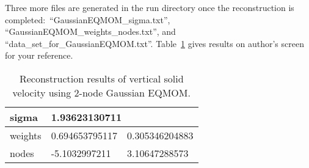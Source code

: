 \documentclass[a4paper,12pt,titlepage]{article}
\begin{document}
Three more files are generated in the run directory once the reconstruction is
completed:\ ``GaussianEQMOM\_sigma.txt'',
\\``GaussianEQMOM\_weights\_nodes.txt'', and
\\``data\_set\_for\_GaussianEQMOM.txt''. Table~\ref{tab:ReconVs} gives results
on author's screen for your reference.

\begin{table}[htp]
 \centering
 \begin{tabular}{l|ll} \hline
  sigma   & \multicolumn{2}{l}{1.93623130711} \\ \hline
  weights & 0.694653795117 & 0.305346204883   \\ \hline
  nodes   & -5.1032997211  & 3.10647288573    \\ \hline
 \end{tabular}
 \caption{Reconstruction results of vertical solid velocity using $2$-node 
 Gaussian EQMOM.}
 \label{tab:ReconVs}
\end{table}



\end{document}
